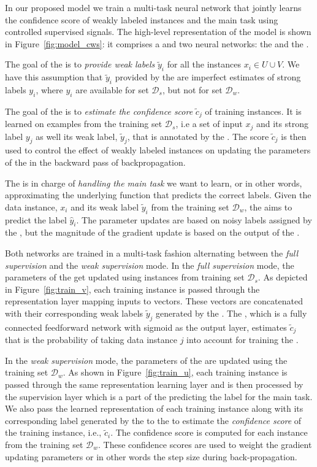 In our proposed model we train a multi-task neural network that jointly learns the confidence score of weakly labeled instances and the main task using controlled supervised signals.
%
The high-level representation of the model is shown in Figure~\ref{fig:model_cws}: it comprises a \wa and two neural networks: the \cnet and the \tnet. 

The goal of the \wa is to \emph{provide weak labels} $\tilde{y}_i$ for all the instances $x_i \in U \cup V$. We have this assumption that $\tilde{y}_i$ provided by the \wa are imperfect estimates of strong labels $y_i$, where $y_i$ are available for set $\mathcal{D}_s$, but not for set $\mathcal{D}_w$.

The goal of the \cnet is to \emph{estimate the confidence score} $\tilde{c}_j$ of training instances. It is learned on examples from the training set $\mathcal{D}_s$, i.e a set of input $x_j$ and its strong label $y_j$ as well its weak label,  $\tilde{y}_j$,  that is annotated by the \wa.
The score $\tilde{c}_j$ is then used to control the effect of weakly labeled instances on updating the parameters of the \tnet in the backward pass of backpropagation.

The \tnet is in charge of \emph{handling the main task} we want to learn, or in other words, approximating the underlying function that predicts the correct labels. 
Given the data instance, $x_i$ and its weak label $\tilde{y}_i$ from the training set $\mathcal{D}_w$, the \tnet aims to predict the label $\hat{y}_i$. 
The \tnet parameter updates are based on noisy labels assigned by the \wa, but the magnitude of the gradient update is based on the output of the \cnet. 

Both networks are trained in a multi-task fashion alternating between the \emph{full supervision} and the \emph{weak supervision} mode.  
In the \emph{full supervision} mode, the parameters of the \cnet get updated using instances from training set $\mathcal{D}_s$.  
As depicted in Figure~\ref{fig:train_v}, each training instance is passed through the representation layer mapping inputs to vectors. These vectors are concatenated with their corresponding weak labels $\tilde{y}_j$ generated by the \wa.
The \cnet, which is a fully connected feedforward network with sigmoid as the output layer, estimates $\tilde{c}_j$ that is the probability of taking data instance $j$ into account for training the \tnet.

In the \emph{weak supervision} mode, the parameters of the \tnet are updated using the training set $\mathcal{D}_w$.
As shown in Figure~\ref{fig:train_u}, each training instance is passed through the same representation learning layer and is then processed by the supervision layer which is a part of the \tnet predicting the label for the main task. 
%
We also pass the learned representation of each training instance along with its corresponding label generated by the \wa to the \cnet to estimate the \emph{confidence score} of the training instance, i.e., $\tilde{c}_i$. 
The confidence score is computed for each instance from the training set $\mathcal{D}_w$. These confidence scores are used to weight the gradient updating \tnet parameters or in other words the step size during back-propagation. 

